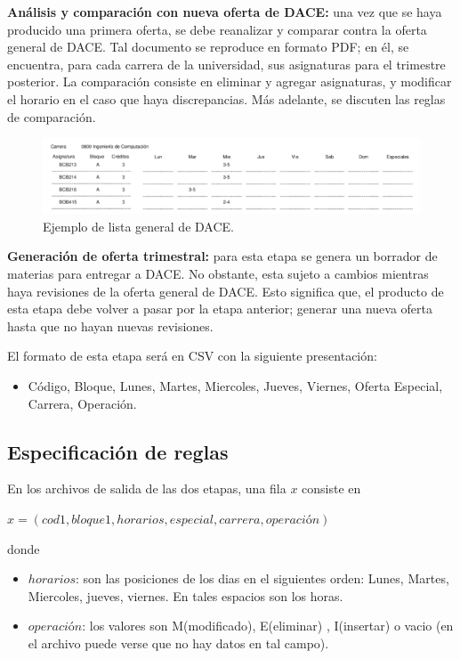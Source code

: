 \documentclass[]{article}
\begin{document}
\textbf{Análisis y comparación con nueva oferta de DACE:} una vez que se
haya producido una primera oferta, se debe reanalizar y comparar contra
la oferta general de DACE. Tal documento se reproduce en formato PDF; en
él, se encuentra, para cada carrera de la universidad, sus asignaturas
para el trimestre posterior. La comparación consiste en eliminar y
agregar asignaturas, y modificar el horario en el caso que haya
discrepancias. Más adelante, se discuten las reglas de comparación.


\begin{figure}[!h]
  \includegraphics[width=\linewidth]{ejemploDACE.png}
  \caption{Ejemplo de lista general de DACE.}
  \label{fig:lista_general_dace}
\end{figure}

\textbf{Generación de oferta trimestral:} para esta etapa se genera un
borrador de materias para entregar a DACE. No obstante, esta sujeto a
cambios mientras haya revisiones de la oferta general de DACE. Esto
significa que, el producto de esta etapa debe volver a pasar por la
etapa anterior; generar una nueva oferta hasta que no hayan nuevas
revisiones.

El formato de esta etapa será en CSV con la siguiente presentación:

\begin{itemize}
\itemsep1pt\parskip0pt
\item
  Código, Bloque, Lunes, Martes, Miercoles, Jueves, Viernes, Oferta
  Especial, Carrera, Operación.
\end{itemize}

\subsection{Especificación de reglas}\label{especificaciuxf3n-de-reglas}

En los archivos de salida de las dos etapas, una fila $x$ consiste en

$x = (cod1,bloque1,horarios,especial,carrera,operación)$

donde

\begin{itemize}
\item
  $horarios$: son las posiciones de los dias en el siguientes orden:
  Lunes, Martes, Miercoles, jueves, viernes. En tales espacios son los
  horas.
\item
  $operación$: los valores son M(modificado), E(eliminar) , I(insertar)
  o vacio (en el archivo puede verse que no hay datos en tal campo).
\end{itemize}
\end{document}
